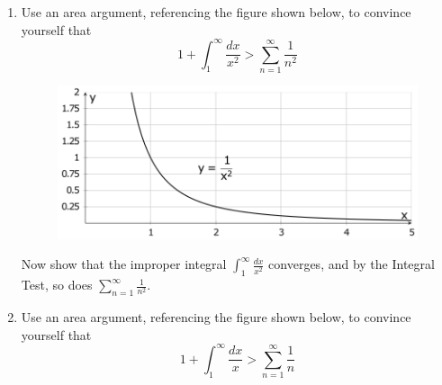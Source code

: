 \documentclass[10pt]{article}
\begin{document}
\begin{enumerate}


\item Use an area argument, referencing the figure shown below, to convince yourself that
\[
1+\int_1^\infty \frac{dx}{x^2} >  \sum_{n=1}^\infty \frac{1}{n^2}
\]

\begin{figure}[h]
%
%
%
\includegraphics[]{23SQ-Math-1336-Ch8s3-Part1-ws-figure0.png}
\end{figure}


Now show that the improper integral \(\int_1^\infty \frac{dx}{x^2}\) converges, and by the Integral Test, so does \(\sum_{n=1}^\infty \frac{1}{n^2}\).\\

\pagebreak

\item Use an area argument, referencing the figure shown below, to convince yourself that
\[
1+\int_1^\infty \frac{dx}{x} > \sum_{n=1}^\infty \frac{1}{n}
\] 


\end{enumerate}
\end{document}
